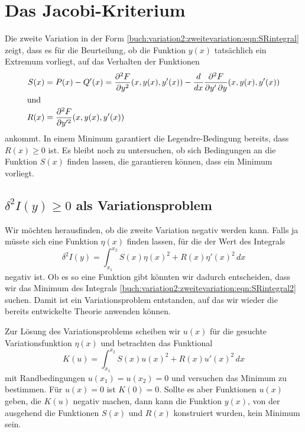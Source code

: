 %
%
%
\section{Das Jacobi-Kriterium
\label{buch:variation2:section:jacobi}}
Die zweite Variation in der Form
\eqref{buch:variation2:zweitevariation:eqn:SRintegral}
zeigt, dass es für die Beurteilung, ob die Funktion $y(x)$ tatsächlich
ein Extremum vorliegt, auf das Verhalten der Funktionen
\begin{align*}
S(x)
&=
P(x) - Q'(x)
=
\frac{\partial^2F}{\partial y^2}(x,y(x),y'(x))
-
\frac{d}{dx}\frac{\partial^2 F}{\partial y'\,\partial y}(x,y(x),y'(x))
\\
\intertext{und}
R(x)
&=
\frac{\partial^2F}{\partial y^{\prime2}}(x,y(x),y'(x))
\end{align*}
ankommt.
In einem Minimum garantiert die Legendre-Bedingung bereits,
dass $R(x)\ge 0$ ist.
Es bleibt noch zu untersuchen, ob sich Bedingungen an die Funktion
$S(x)$ finden lassen, die garantieren können, dass ein Minimum
vorliegt.

%
%
\subsection{$\delta^2 I(y)\ge 0$ als Variationsproblem
\label{buch:variation2:jacobi:subsection:delta2I}}
Wir möchten herausfinden, ob die zweite Variation negativ werden kann.
Falls ja müsste sich eine Funktion $\eta(x)$ finden lassen, für die
der Wert des Integrals
\begin{equation}
\delta^2 I(y)
=
\int_{x_1}^{x_2}
S(x)\eta(x)^2 + R(x)\eta'(x)^2
\,dx
\label{buch:variation2:zweitevariation:eqn:SRintegral2}
\end{equation}
negativ ist.
Ob es so eine Funktion gibt könnten wir dadurch entscheiden, dass wir
das Minimum des Integrals
\eqref{buch:variation2:zweitevariation:eqn:SRintegral2}
suchen.
Damit ist ein Variationsproblem entstanden, auf das wir wieder die
bereits entwickelte Theorie anwenden können.

Zur Lösung des Variationsproblems scheiben wir $u(x)$ für die gesuchte
Variationsfunktion $\eta(x)$ und betrachten das Funktional
\begin{equation}
K(u)
=
\int_{x_1}^{x_2}
S(x) u(x)^2 + R(x) u'(x)^2
\,dx
\label{buch:variation2:jacobi:eqn:K}
\end{equation}
mit Randbedingungen $u(x_1)=u(x_2)=0$ und versuchen das Minimum
zu bestimmen.
Für $u(x)=0$ ist $K(0)=0$.
Sollte es aber Funktionen $u(x)$ geben, die $K(u)$ negativ machen,
dann kann die Funktion $y(x)$, von der ausgehend die Funktionen $S(x)$
und $R(x)$ konstruiert wurden, kein Minimum sein.

